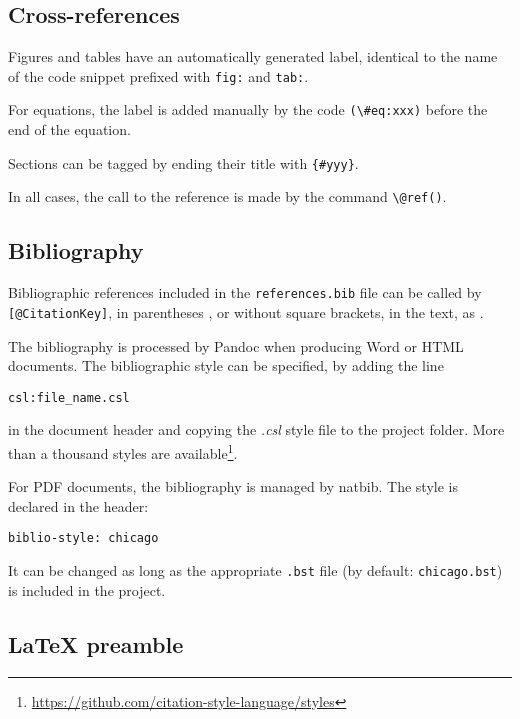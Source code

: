 \documentclass[fleqn,]{article} %
\begin{document}
\subsection{Cross-references}\label{cross-references}

Figures and tables have an automatically generated label, identical to the name of the code snippet prefixed with \texttt{fig:} and \texttt{tab:}.

For equations, the label is added manually by the code \texttt{(\textbackslash{}\#eq:xxx)} before the end of the equation.

Sections can be tagged by ending their title with \texttt{\{\#yyy\}}.

In all cases, the call to the reference is made by the command \texttt{\textbackslash{}@ref()}.

\subsection{Bibliography}\label{bibliography}

Bibliographic references included in the \texttt{references.bib} file can be called by \texttt{{[}@CitationKey{]}}, in parentheses \citep{Xie2016}, or without square brackets, in the text, as \citet{Xie2018} .

The bibliography is processed by Pandoc when producing Word or HTML documents.
The bibliographic style can be specified, by adding the line

\begin{verbatim}
csl:file_name.csl
\end{verbatim}

in the document header and copying the \emph{.csl} style file to the project folder.
More than a thousand styles are available\footnote{\url{https://github.com/citation-style-language/styles}}.

For PDF documents, the bibliography is managed by natbib.
The style is declared in the header:

\begin{verbatim}
biblio-style: chicago
\end{verbatim}

It can be changed as long as the appropriate \texttt{.bst} file (by default: \texttt{chicago.bst}) is included in the project.

\subsection{LaTeX preamble}\label{latex-preamble}
\end{document}
